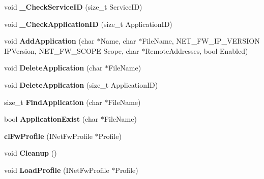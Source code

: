 \begin{DoxyCompactItemize}
\item 
\hypertarget{classcl_fw_profile_aadcf9bbdf92e0558b5203cec3b08e658}{
void {\bfseries \_\-CheckServiceID} (size\_\-t ServiceID)}
\label{classcl_fw_profile_aadcf9bbdf92e0558b5203cec3b08e658}

\item 
\hypertarget{classcl_fw_profile_a021e80be56f9236ea45c9d15d45967f4}{
void {\bfseries \_\-CheckApplicationID} (size\_\-t ApplicationID)}
\label{classcl_fw_profile_a021e80be56f9236ea45c9d15d45967f4}

\item 
\hypertarget{classcl_fw_profile_a56f8eec28f7f2e4f7aa76fc2c97a10a3}{
void {\bfseries AddApplication} (char $\ast$Name, char $\ast$FileName, NET\_\-FW\_\-IP\_\-VERSION IPVersion, NET\_\-FW\_\-SCOPE Scope, char $\ast$RemoteAddresses, bool Enabled)}
\label{classcl_fw_profile_a56f8eec28f7f2e4f7aa76fc2c97a10a3}

\item 
\hypertarget{classcl_fw_profile_a84263630c24ee05e35a29a7cf786020c}{
void {\bfseries DeleteApplication} (char $\ast$FileName)}
\label{classcl_fw_profile_a84263630c24ee05e35a29a7cf786020c}

\item 
\hypertarget{classcl_fw_profile_a241fec9b26cc2d170e70921b83107ca3}{
void {\bfseries DeleteApplication} (size\_\-t ApplicationID)}
\label{classcl_fw_profile_a241fec9b26cc2d170e70921b83107ca3}

\item 
\hypertarget{classcl_fw_profile_ad68fa0190d97cfe9e6b918d32c4ee96f}{
size\_\-t {\bfseries FindApplication} (char $\ast$FileName)}
\label{classcl_fw_profile_ad68fa0190d97cfe9e6b918d32c4ee96f}

\item 
\hypertarget{classcl_fw_profile_a937e8cbd987aa3801bf83f5615d3eba3}{
bool {\bfseries ApplicationExist} (char $\ast$FileName)}
\label{classcl_fw_profile_a937e8cbd987aa3801bf83f5615d3eba3}

\item 
\hypertarget{classcl_fw_profile_af7aed5ca654ee8e3c1390100ea754cc1}{
{\bfseries clFwProfile} (INetFwProfile $\ast$Profile)}
\label{classcl_fw_profile_af7aed5ca654ee8e3c1390100ea754cc1}

\item 
\hypertarget{classcl_fw_profile_a130186644eeb31c330fbe37c68dac39f}{
void {\bfseries Cleanup} ()}
\label{classcl_fw_profile_a130186644eeb31c330fbe37c68dac39f}

\item 
\hypertarget{classcl_fw_profile_a0a52b9939e6d45b491acef2ce308c646}{
void {\bfseries LoadProfile} (INetFwProfile $\ast$Profile)}
\label{classcl_fw_profile_a0a52b9939e6d45b491acef2ce308c646}

\end{DoxyCompactItemize}
